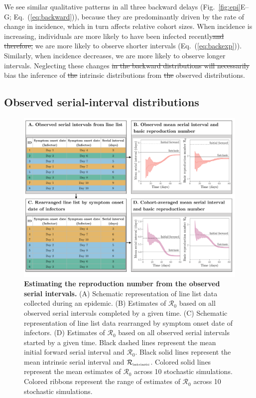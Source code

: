 \documentclass[12pt]{article}
\newcommand{\eref}[1]{Eq.~(\ref{eq:#1})}
\newcommand{\fref}[1]{Fig.~\ref{fig:#1}}
\newcommand{\Rx}[1]{\ensuremath{{\mathcal R}_{#1}}\xspace}
\newcommand{\Ro}{\Rx{0}}
\newcommand{\Rintrinsic}{\ensuremath{{\mathcal R}_{\textrm{\tiny intrinsic}}}\xspace}
\providecommand{\DIFaddtex}[1]{{\protect\color{blue}\uwave{#1}}} %
\providecommand{\DIFdeltex}[1]{{\protect\color{red}\sout{#1}}}                      %
\providecommand{\DIFaddbegin}{} %
\providecommand{\DIFaddend}{} %
\providecommand{\DIFdelbegin}{} %
\providecommand{\DIFdelend}{} %
\providecommand{\DIFadd}[1]{\texorpdfstring{\DIFaddtex{#1}}{#1}} %
\providecommand{\DIFdel}[1]{\texorpdfstring{\DIFdeltex{#1}}{}} %
\newcommand{\DIFscaledelfig}{0.5}
\newlength{\DIFdelgraphicswidth} %
\newlength{\DIFdelgraphicsheight} %
\newcommand{\DIFaddincludegraphics}[2][]{{\color{blue}\fbox{\DIFOincludegraphics[#1]{#2}}}} %
\newcommand{\DIFdelincludegraphics}[2][]{%
\sbox{\DIFdelgraphicsbox}{\DIFOincludegraphics[#1]{#2}}%
\settoboxwidth{\DIFdelgraphicswidth}{\DIFdelgraphicsbox} %
\settoboxtotalheight{\DIFdelgraphicsheight}{\DIFdelgraphicsbox} %
\scalebox{\DIFscaledelfig}{%
\parbox[b]{\DIFdelgraphicswidth}{\usebox{\DIFdelgraphicsbox}\\[-\baselineskip] \rule{\DIFdelgraphicswidth}{0em}}\llap{\resizebox{\DIFdelgraphicswidth}{\DIFdelgraphicsheight}{%
\setlength{\unitlength}{\DIFdelgraphicswidth}%
\begin{picture}(1,1)%
\thicklines\linethickness{2pt} %
{\color[rgb]{1,0,0}\put(0,0){\framebox(1,1){}}}%
{\color[rgb]{1,0,0}\put(0,0){\line( 1,1){1}}}%
{\color[rgb]{1,0,0}\put(0,1){\line(1,-1){1}}}%
\end{picture}%
}\hspace*{3pt}}} %
} %
\DeclareRobustCommand{\DIFaddbegin}{\DIFOaddbegin \let\includegraphics\DIFaddincludegraphics} %
\DeclareRobustCommand{\DIFaddend}{\DIFOaddend \let\includegraphics\DIFOincludegraphics} %
\DeclareRobustCommand{\DIFdelbegin}{\DIFOdelbegin \let\includegraphics\DIFdelincludegraphics} %
\DeclareRobustCommand{\DIFdelend}{\DIFOaddend \let\includegraphics\DIFOincludegraphics} %
\begin{document}
We see similar qualitative patterns in all three backward delays (\fref{epi}E--G; \eref{backward}), because they are predominantly driven by the rate of change in incidence, which in turn affects relative cohort sizes.
When incidence is increasing, individuals are more likely to have been infected recently\DIFdelbegin \DIFdel{and therefore, }\DIFdelend \DIFaddbegin \DIFadd{, and therefore }\DIFaddend we are more likely to observe shorter intervals (\eref{backexp}).
Similarly, when incidence decreases, we are more likely to observe longer intervals.
Neglecting these changes \DIFdelbegin \DIFdel{in the backward distributions will necessarily }\DIFdelend \DIFaddbegin \DIFadd{will }\DIFaddend bias the inference of \DIFdelbegin \DIFdel{the }\DIFdelend intrinsic distributions from \DIFdelbegin \DIFdel{the }\DIFdelend observed distributions.

\subsection{Observed serial-interval distributions}

\begin{figure}[!ht]
\includegraphics[width=\textwidth]{diagram.pdf}
\caption{
\textbf{Estimating the reproduction number from the observed serial intervals.}
(A) Schematic representation of line list data collected during an epidemic.
(B) Estimates of \Ro based on all observed serial intervals completed by a given time.
(C) Schematic representation of line list data rearranged by symptom onset date of infectors.
(D) Estimates of \Ro based on all observed serial intervals started by a given time. 
Black dashed lines represent the mean initial forward serial interval and \Ro.
Black solid lines represent the mean intrinsic serial interval and \Rintrinsic.
Colored solid lines represent the mean estimates of \Ro across 10 stochastic simulations.
Colored ribbons represent the range of estimates of \Ro across 10 stochastic simulations.
}
\label{fig:obsrR}
\end{figure}
\end{document}
